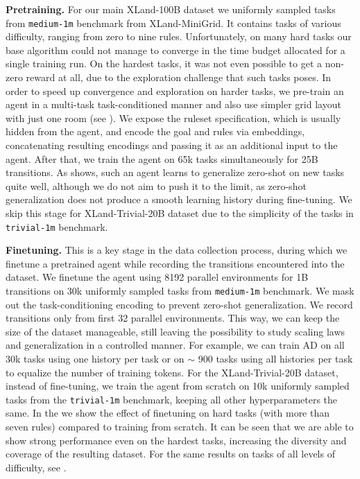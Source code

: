 \documentclass{article}
\begin{document}
\textbf{Pretraining.} For our main XLand-100B dataset we uniformly sampled tasks from \texttt{medium-1m} benchmark from XLand-MiniGrid. It contains tasks of various difficulty, ranging from zero to nine rules.
Unfortunately, on many hard tasks our base algorithm could not manage to converge in the time budget allocated for a single training run. On the hardest tasks, it was not even possible to get a non-zero reward at all, due to the exploration challenge that such tasks poses. In order to speed up convergence and exploration on harder tasks, we pre-train an agent in a multi-task task-conditioned manner and also use simpler grid layout with just one room (see ). We expose the ruleset specification, which is usually hidden from the agent, and encode the goal and rules via embeddings, concatenating resulting encodings and passing it as an additional input to the agent. After that, we train the agent on 65k tasks simultaneously for 25B transitions. As  shows, such an agent learns to generalize zero-shot on new tasks quite well, although we do not aim to push it to the limit, as zero-shot generalization does not produce a smooth learning history during fine-tuning. We skip this stage for XLand-Trivial-20B dataset due to the simplicity of the tasks in \texttt{trivial-1m} benchmark. 

\textbf{Finetuning.} This is a key stage in the data collection process, during which we finetune a pretrained agent while recording the transitions encountered into the dataset. We finetune the agent using 8192 parallel environments for 1B transitions on 30k uniformly sampled tasks from \texttt{medium-1m} benchmark. We mask out the task-conditioning encoding to prevent zero-shot generalization. We record transitions only from first 32 parallel environments. This way, we can keep the size of the dataset manageable, still leaving the possibility to study scaling laws and generalization in a controlled manner. For example, we can train AD \citep{laskin2022context} on all 30k tasks using one history per task or on $\sim$ 900 tasks using all histories per task to equalize the number of training tokens. For the XLand-Trivial-20B dataset, instead of fine-tuning, we train the agent from scratch on 10k uniformly sampled tasks from the \texttt{trivial-1m} benchmark, keeping all other hyperparameters the same. In the  we show the effect of finetuning on hard tasks (with more than seven rules) compared to training from scratch. It can be seen that we are able to show strong performance even on the hardest tasks, increasing the diversity and coverage of the resulting dataset. For the same results on tasks of all levels of difficulty, see .
\end{document}
